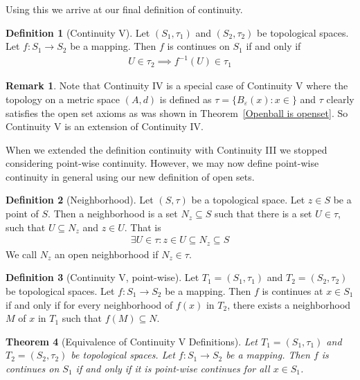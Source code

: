 \documentclass{article}
\theoremstyle{plain}
\newtheorem{theorem}{Theorem}
\theoremstyle{definition}
\newtheorem*{remark}{Remark}
\newtheorem{definition}[theorem]{Definition}
\begin{document}
Using this we arrive at our final definition of continuity.
\begin{definition}[Continuity V]
	Let $(S_1,\tau_1)$ and $(S_2,\tau_2)$ be topological spaces. Let
	$f:S_1\rightarrow S_2$ be a mapping. Then $f$ is continues on $S_1$ if and
	only if
	\begin{equation}
	\begin{aligned}
		U\in\tau_2 \implies f^{-1}(U)\in\tau_1
	\end{aligned}
	\end{equation}
\end{definition}
\begin{remark}
	Note that Continuity IV is a special case of Continuity V
	where the topology on a metric space $(A,d)$ is defined as
	$\tau=\{B_{\varepsilon}(x):x\in\}$ and $\tau$ clearly satisfies
	the open set axioms as was shown in Theorem~\ref{Openball is
	openset}. So Continuity V is an extension of Continuity IV.
\end{remark}
When we extended the definition continuity with Continuity III we stopped
considering point-wise continuity. However, we may now define point-wise
continuity in general using our new definition of open sets.
\begin{definition}[Neighborhood]
	Let $(S,\tau)$ be a topological space. Let $z\in S$ be a point of $S$. Then
	a neighborhood is a set $N_z\subseteq S$ such that there is a set $U\in
	\tau$, such that $U\subseteq N_z$ and $z\in U$. That is
	\begin{equation}
	\begin{aligned}
		\exists U\in\tau: z\in U\subseteq N_z \subseteq S
	\end{aligned}
	\end{equation}
	We call $N_z$ an open neighborhood if $N_z\in\tau$.
\end{definition}
\begin{definition}[Continuity V, point-wise]
	Let $T_1=(S_1,\tau_1)$ and $T_2=(S_2,\tau_2)$ be topological spaces. Let
	$f:S_1\rightarrow S_2$ be a mapping. Then $f$ is continues at $x\in S_1$ 
	if and only if for every neighborhood of $f(x)$ in $T_2$, there exists a
	neighborhood $M$ of $x$ in $T_1$ such that $f(M)\subseteq N$.
\end{definition}
\begin{theorem}[Equivalence of Continuity V Definitions]
	Let $T_1=(S_1,\tau_1)$ and $T_2=(S_2,\tau_2)$ be topological spaces. Let
	$f:S_1\rightarrow S_2$ be a mapping. Then $f$ is continues on $S_1$ if and
	only if it is point-wise continues for all $x\in S_1$.
\end{theorem}
\end{document}
